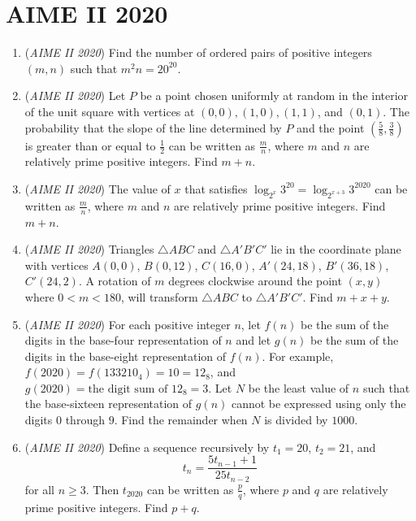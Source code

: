 \section{AIME II 2020}
        \begin{enumerate}
        	\item (\textit{AIME II 2020}) Find the number of ordered pairs of positive integers $(m,n)$ such that ${m^2n = 20 ^{20}}$.


 

	\item (\textit{AIME II 2020}) Let $P$ be a point chosen uniformly at random in the interior of the unit square with vertices at $(0,0), (1,0), (1,1)$, and $(0,1)$. The probability that the slope of the line determined by $P$ and the point $\left(\frac58, \frac38 \right)$ is greater than or equal to $\frac12$ can be written as $\frac{m}{n}$, where $m$ and $n$ are relatively prime positive integers. Find $m+n$.


 

	\item (\textit{AIME II 2020}) The value of $x$ that satisfies $\log_{2^x} 3^{20} = \log_{2^{x+3}} 3^{2020}$ can be written as $\frac{m}{n}$, where $m$ and $n$ are relatively prime positive integers. Find $m+n$.


 

	\item (\textit{AIME II 2020}) Triangles $\triangle ABC$ and $\triangle A'B'C'$ lie in the coordinate plane with vertices $A(0,0)$, $B(0,12)$, $C(16,0)$, $A'(24,18)$, $B'(36,18)$, $C'(24,2)$. A rotation of $m$ degrees clockwise around the point $(x,y)$ where $0<m<180$, will transform $\triangle ABC$ to $\triangle A'B'C'$. Find $m+x+y$.


 

	\item (\textit{AIME II 2020}) For each positive integer $n$, let $f(n)$ be the sum of the digits in the base-four representation of $n$ and let $g(n)$ be the sum of the digits in the base-eight representation of $f(n)$. For example, $f(2020) = f(133210_{\text{4}}) = 10 = 12_{\text{8}}$, and $g(2020) = \text{the digit sum of }12_{\text{8}} = 3$. Let $N$ be the least value of $n$ such that the base-sixteen representation of $g(n)$ cannot be expressed using only the digits $0$ through $9$. Find the remainder when $N$ is divided by $1000$.


 

	\item (\textit{AIME II 2020}) Define a sequence recursively by $t_1 = 20$, $t_2 = 21$, and
 \[t_n = \frac{5t_{n-1}+1}{25t_{n-2}}\]for all $n \ge 3$. Then $t_{2020}$ can be written as $\frac{p}{q}$, where $p$ and $q$ are relatively prime positive integers. Find $p+q$.



\end{enumerate}
